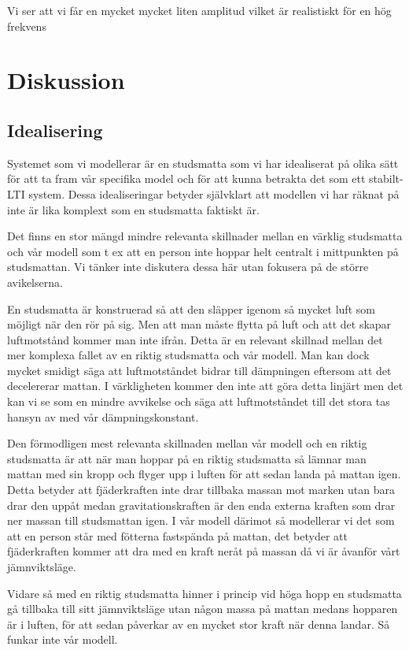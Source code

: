 \documentclass[10pt,a4paper]{article}
\begin{document}
Vi ser att vi får en mycket mycket liten amplitud vilket är realistiskt för en hög frekvens

\section{Diskussion}

\subsection{Idealisering}
Systemet som vi modellerar är en studsmatta som vi har idealiserat på olika sätt för att ta fram vår specifika model och för att kunna betrakta det som ett stabilt-LTI system. Dessa idealiseringar betyder självklart att modellen vi har räknat på inte är lika komplext som en studsmatta faktiskt är. 

Det finns en stor mängd mindre relevanta skillnader mellan en värklig studsmatta och vår modell som t ex att en person inte hoppar helt centralt i mittpunkten på studsmattan. Vi tänker inte diskutera dessa här utan fokusera på de större avikelserna.

En studsmatta är konstruerad så att den släpper igenom så mycket luft som möjligt när den rör på sig. Men att man måste flytta på luft och att det skapar luftmotstånd kommer man inte ifrån. Detta är en relevant skillnad mellan det mer komplexa fallet av en riktig studsmatta och vår modell. Man kan dock mycket smidigt säga att luftmotståndet bidrar till dämpningen eftersom att det decelererar mattan. I värkligheten kommer den inte att göra detta linjärt men det kan vi se som en mindre avvikelse och säga att luftmotståndet till det stora tas hansyn av med vår dämpningskonstant.

Den förmodligen mest relevanta skillnaden mellan vår modell och en riktig studsmatta är att när man hoppar på en riktig studsmatta så lämnar man mattan med sin kropp och flyger upp i luften för att sedan landa på mattan igen. Detta betyder att fjäderkraften inte drar tillbaka massan mot marken utan bara drar den uppåt medan gravitationskraften är den enda externa kraften som drar ner massan till studsmattan igen. I vår modell därimot så modellerar vi det som att en person står med fötterna fastspända på mattan, det betyder att fjäderkraften kommer att dra med en kraft neråt på massan då vi är åvanför vårt jämnviktsläge.

Vidare så med en riktig studsmatta hinner i princip vid höga hopp en studsmatta gå tillbaka till sitt jämnviktsläge utan någon massa på mattan medans hopparen är i luften, för att sedan påverkar av en mycket stor kraft när denna landar. Så funkar inte vår modell.
\end{document}
